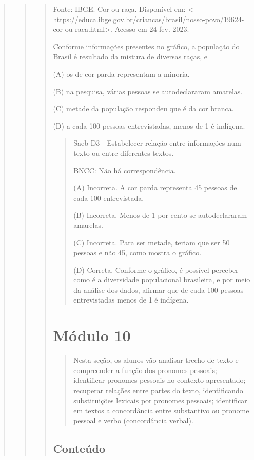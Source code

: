 \begin{quote}
\begin{quote}
\begin{quote}
\protect\hypertarget{_Hlk40547643}{}{}

Fonte: IBGE. Cor ou raça. Disponível em: \textless{}
https://educa.ibge.gov.br/criancas/brasil/nosso-povo/19624-cor-ou-raca.html\textgreater{}.
Acesso em 24 fev. 2023.

Conforme informações presentes no gráfico, a população do Brasil é
resultado da mistura de diversas raças, e

(A) os de cor parda representam a minoria.

(B) na pesquisa, várias pessoas se autodeclararam amarelas.

(C) metade da população respondeu que é da cor branca.

(D) a cada 100 pessoas entrevistadas, menos de 1 é indígena.

\begin{quote}
Saeb D3 - Estabelecer relação entre informações num texto ou entre
diferentes textos.

BNCC: Não há correspondência.

(A) Incorreta. A cor parda representa 45 pessoas de cada 100
entrevistada.

(B) Incorreta. Menos de 1 por cento se autodeclararam amarelas.

(C) Incorreta. Para ser metade, teriam que ser 50 pessoas e não 45, como
mostra o gráfico.

(D) Correta. Conforme o gráfico, é possível perceber como é a
diversidade populacional brasileira, e por meio da análise dos dados,
afirmar que de cada 100 pessoas entrevistadas menos de 1 é indígena.
\end{quote}

\section{Módulo 10}\label{muxf3dulo-10}

\begin{quote}
Nesta seção, os alunos vão analisar trecho de texto e compreender a
função dos pronomes pessoais; identificar pronomes pessoais no contexto
apresentado; recuperar relações entre partes do texto, identificando
substituições lexicais por pronomes pessoais; identificar em textos a
concordância entre substantivo ou pronome pessoal e verbo (concordância
verbal).
\end{quote}

\subsection{Conteúdo}\label{conteuxfado-9}


\end{quote}
\end{quote}
\end{quote}
